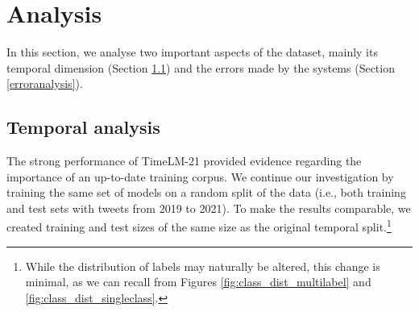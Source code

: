 \section{Analysis}
\label{analysis}
In this section, we analyse two important aspects of the \TweetTopic dataset, mainly its temporal dimension (Section \ref{sec:temporal}) and the errors made by the systems (Section \ref{erroranalysis}). 

\subsection{Temporal analysis}
\label{sec:temporal}

The strong performance of TimeLM-21 provided evidence regarding the importance of an up-to-date training corpus. We continue our investigation by training the same set of models on a random split of the data (i.e., both training and test sets with tweets from 2019 to 2021). To make the results comparable, we created training and test sizes of the same size as the original temporal split.\footnote{While the distribution of labels may naturally be altered, this change is minimal, as we can recall from Figures \ref{fig:class_dist_multilabel} and \ref{fig:class_dist_singleclass}.} 

